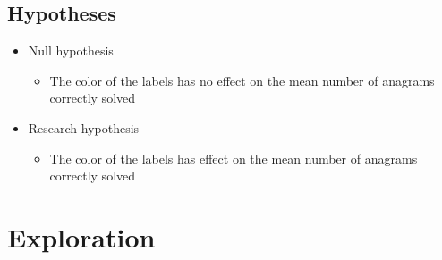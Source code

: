 \documentclass{article}
\begin{document}
\subsection*{Hypotheses}
	\begin{itemize}
	\item{Null hypothesis}
	\begin{itemize}
	\item{The color of the labels has no effect on the mean number of anagrams correctly solved}
	\end{itemize}
	\item{Research hypothesis}
	\begin{itemize}
	\item{The color of the labels has effect on the mean number of anagrams correctly solved}
	\end{itemize}
	\end{itemize}

\section*{Exploration}
\end{document}
